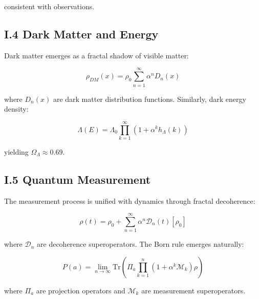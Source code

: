 consistent with observations.

\subsection*{I.4 Dark Matter and Energy}

Dark matter emerges as a fractal shadow of visible matter:

\[
\rho_{DM}(x) = \rho_0 \sum_{n=1}^{\infty} \alpha^n D_n(x)
\]

where $D_n(x)$ are dark matter distribution functions. Similarly, dark energy density:

\[
\Lambda(E) = \Lambda_0 \prod_{k=1}^{\infty} (1 + \alpha^k h_\Lambda(k))
\]

yielding $\Omega_\Lambda \approx 0.69$.

\subsection*{I.5 Quantum Measurement}

The measurement process is unified with dynamics through fractal decoherence:

\[
\rho(t) = \rho_0 + \sum_{n=1}^{\infty} \alpha^n \mathcal{D}_n(t)[\rho_0]
\]

where $\mathcal{D}_n$ are decoherence superoperators. The Born rule emerges naturally:

\[
P(a) = \lim_{n \to \infty} \text{Tr}\left(\Pi_a \prod_{k=1}^n (1 + \alpha^k \mathcal{M}_k)\rho\right)
\]

where $\Pi_a$ are projection operators and $\mathcal{M}_k$ are measurement superoperators. 
